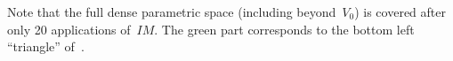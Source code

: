 \documentclass{llncs}
\newcommand{\IM}{\mathit{IM}}
\newcommand{\commentaire}[1]{\textcolor{red}{\textbf{$\Leftarrow$  #1 $\Rightarrow$}}}
\begin{document}
Note that the full dense parametric space (including beyond~$V_0$) is covered after only 20 applications of~$\IM$.
The green part corresponds to the bottom left ``triangle'' of~\cite[Figure~1(a)]{bb04}.


% 
% 
% 
\end{document}
